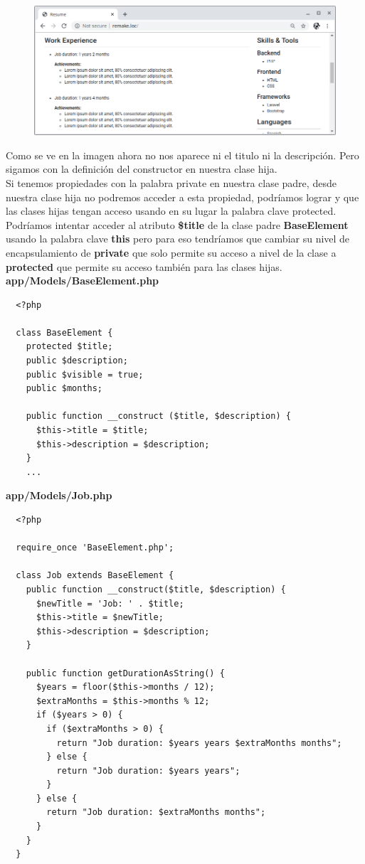\documentclass{article}
\begin{document}
\newpage

\begin{figure}[h!]
  \centering
  \includegraphics[scale=0.5]{./Pictures/046_pol_constructor.png}
\end{figure}

Como se ve en la imagen ahora no nos aparece ni el titulo ni la descripción.
Pero sigamos con la definición del constructor en nuestra clase hija.\\

Si tenemos propiedades con la palabra private en nuestra clase padre, desde
nuestra clase hija no podremos acceder a esta propiedad, podríamos lograr y que
las clases hijas tengan acceso usando en su lugar la palabra clave protected.\\

Podríamos intentar acceder al atributo \textbf{\$title} de la clase padre
\textbf{BaseElement} usando la palabra clave \textbf{this} pero para eso
tendríamos que cambiar su nivel de encapsulamiento de \textbf{private} que solo
permite su acceso a nivel de la clase a \textbf{protected} que permite su
acceso también para las clases hijas.\\

\textbf{app/Models/BaseElement.php}
\begin{verbatim}
  <?php

  class BaseElement {
    protected $title;
    public $description;
    public $visible = true;
    public $months;

    public function __construct ($title, $description) {
      $this->title = $title;
      $this->description = $description;
    }
    ...
\end{verbatim}

\textbf{app/Models/Job.php}
\begin{verbatim}
  <?php

  require_once 'BaseElement.php';

  class Job extends BaseElement {
    public function __construct($title, $description) {
      $newTitle = 'Job: ' . $title;
      $this->title = $newTitle;
      $this->description = $description;
    }

    public function getDurationAsString() {
      $years = floor($this->months / 12);
      $extraMonths = $this->months % 12;
      if ($years > 0) {
        if ($extraMonths > 0) {
          return "Job duration: $years years $extraMonths months";
        } else {
          return "Job duration: $years years";
        }
      } else {
        return "Job duration: $extraMonths months";
      }
    }
  }
\end{verbatim}
\end{document}
